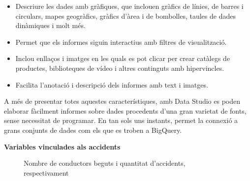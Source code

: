 \documentclass[11pt,longbibliography]{article}
\theoremstyle{definition}
\theoremstyle{remark}
\begin{document}
\begin{itemize}

\item Descriure les dades amb gràfiques, que inclouen gràfics de línies, de barres i circulars, mapes geogràfics, gràfics d'àrea i de bombolles, taules de dades dinàmiques i molt més.

\item Permet que els informes siguin interactius amb filtres de visualització.

\item Inclou enllaços i imatges en les quals es pot clicar per crear catàlegs de productes, biblioteques de vídeo i altres continguts amb hipervincles.

\item Facilita l'anotació i descripció dels informes amb text i imatges.

\end{itemize}


A més de presentar totes aquestes característiques, amb Data Studio es poden elaborar fàcilment informes sobre dades procedents d'una gran varietat de fonts, sense necessitat de programar. En tan sols uns instants, permet la connexió a grans conjunts de dades com els que es troben a BigQuery.


\textbf{Variables vinculades als accidents}


\begin{figure}[h!]
\par
{}%
\hfill
{}%
\par

\caption{Nombre de conductors beguts i quantitat d'accidents, respectivament}
\label{fig:G1}
\end{figure}
\end{document}
